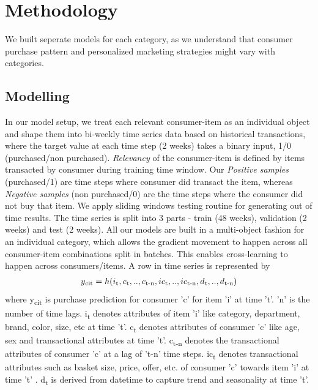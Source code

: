 \section{Methodology}
\label{sec:methodology}
We built seperate models for each category, as we understand that consumer purchase pattern and personalized 
marketing strategies might vary with categories.

\subsection{Modelling}
In our model setup, we treat each relevant consumer-item as an individual object and shape them into bi-weekly time series 
data based on historical transactions, where the target value at each time step (2 weeks) takes a binary input, 1/0 
(purchased/non purchased). \emph{Relevancy} of the consumer-item is defined by items transacted by consumer during training 
time window. Our \emph{Positive samples} (purchased/1) are time steps where consumer did transact the item, whereas 
\emph{Negative samples} (non purchased/0) are the time steps where the consumer did not buy that item.
We apply sliding windows testing routine for generating out of time results. The time series is split into 
3 parts - train (48 weeks), validation (2 weeks) and test (2 weeks). All our models are built in a multi-object 
fashion for an individual category, which allows the gradient movement to happen across all consumer-item combinations 
split in batches. This enables cross-learning to happen across consumers/items. A row 
in time series is represented by
  \begin{equation}
    \begin{array}{l}
      y\textsubscript{cit}  = h(i\textsubscript{t}, c\textsubscript{t},..,c\textsubscript{t-n}, ic\textsubscript{t}
      ,..,ic\textsubscript{t-n}, d\textsubscript{t},..,d\textsubscript{t-n})
    \end{array}
    \label{eqn:fx}
  \end{equation}
where y\textsubscript{cit} is purchase prediction for consumer 'c' for item ’i’ at time ’t’. 
'n' is the number of time lags.
i\textsubscript{t} denotes attributes of item ’i’ like category, department, brand, color, size, etc at time 't'. 
c\textsubscript{t} denotes attributes of consumer 'c' like age, sex and transactional attributes at time 't'. 
c\textsubscript{t-n} denotes the transactional attributes of consumer 'c' at a lag of 't-n' time steps.
ic\textsubscript{t} denotes transactional attributes such as basket size, price, offer, etc. 
of consumer 'c'  towards item 'i' at time 't' . 
d\textsubscript{t} is derived from datetime to capture trend and seasonality at time 't'. 

